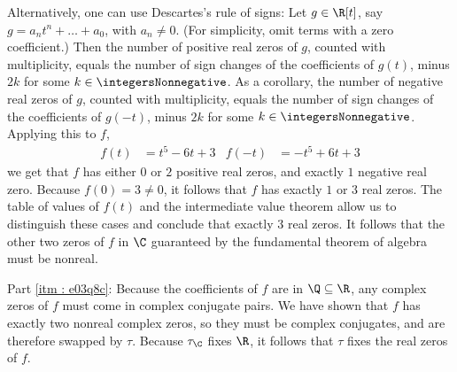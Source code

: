 {Alternatively, one can use Descartes's rule of signs: Let $g \in \R[t]$, say $g = a_{n} t^{n} + \ldots + a_{0}$, with $a_{n} \neq 0$. (For simplicity, omit terms with a zero coefficient.) Then the number of positive real zeros of $g$, counted with multiplicity, equals the number of sign changes of the coefficients of $g(t)$, minus $2 k$ for some $k \in \integersNonnegative$. As a corollary, the number of negative real zeros of $g$, counted with multiplicity, equals the number of sign changes of the coefficients of $g(-t)$, minus $2 k$ for some $k \in \integersNonnegative$. Applying this to $f$,
\begin{align*}
f(t)
&=
t^{5} - 6 t + 3
&
f(-t)
&=
-t^{5} + 6 t + 3
\end{align*}
we get that $f$ has either $0$ or $2$ positive real zeros, and exactly $1$ negative real zero. Because $f(0) = 3 \neq 0$, it follows that $f$ has exactly $1$ or $3$ real zeros. The table of values of $f(t)$ and the intermediate value theorem allow us to distinguish these cases and conclude that exactly $3$ real zeros. It follows that the other two zeros of $f$ in $\C$ guaranteed by the fundamental theorem of algebra must be nonreal.

Part \ref{itm : e03q8c}: Because the coefficients of $f$ are in $\Q \subseteq \R$, any complex zeros of $f$ must come in complex conjugate pairs. We have shown that $f$ has exactly two nonreal complex zeros, so they must be complex conjugates, and are therefore swapped by $\tau$. Because $\tau_{\C}$ fixes $\R$, it follows that $\tau$ fixes the real zeros of $f$.

}
